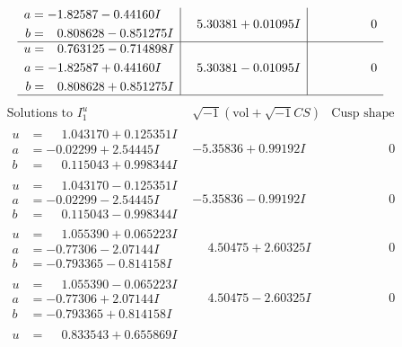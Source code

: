 \documentclass[1p]{elsarticle_modified}
\theoremstyle{definition}
\newcommand{\I}{\sqrt{-1}}
\begin{document}
$$\begin{array}{c|c|c}
\begin{aligned}
a &= -1.82587 - 0.44160 I \\
b &= \phantom{-}0.808628 - 0.851275 I\end{aligned}
 & \phantom{-}5.30381 + 0.01095 I & \phantom{-0.000000 } 0 \\ \hline\begin{aligned}
u &= \phantom{-}0.763125 - 0.714898 I \\
a &= -1.82587 + 0.44160 I \\
b &= \phantom{-}0.808628 + 0.851275 I\end{aligned}
 & \phantom{-}5.30381 - 0.01095 I & \phantom{-0.000000 } 0\\
 \hline 
 \end{array}$$\newpage$$\begin{array}{c|c|c}  
\text{Solutions to }I^u_{1}& \I (\text{vol} + \sqrt{-1}CS) & \text{Cusp shape}\\
 \hline 
\begin{aligned}
u &= \phantom{-}1.043170 + 0.125351 I \\
a &= -0.02299 + 2.54445 I \\
b &= \phantom{-}0.115043 + 0.998344 I\end{aligned}
 & -5.35836 + 0.99192 I & \phantom{-0.000000 } 0 \\ \hline\begin{aligned}
u &= \phantom{-}1.043170 - 0.125351 I \\
a &= -0.02299 - 2.54445 I \\
b &= \phantom{-}0.115043 - 0.998344 I\end{aligned}
 & -5.35836 - 0.99192 I & \phantom{-0.000000 } 0 \\ \hline\begin{aligned}
u &= \phantom{-}1.055390 + 0.065223 I \\
a &= -0.77306 - 2.07144 I \\
b &= -0.793365 - 0.814158 I\end{aligned}
 & \phantom{-}4.50475 + 2.60325 I & \phantom{-0.000000 } 0 \\ \hline\begin{aligned}
u &= \phantom{-}1.055390 - 0.065223 I \\
a &= -0.77306 + 2.07144 I \\
b &= -0.793365 + 0.814158 I\end{aligned}
 & \phantom{-}4.50475 - 2.60325 I & \phantom{-0.000000 } 0 \\ \hline\begin{aligned}
u &= \phantom{-}0.833543 + 0.655869 I \\

\end{aligned}
\end{array}$$
\end{document}
